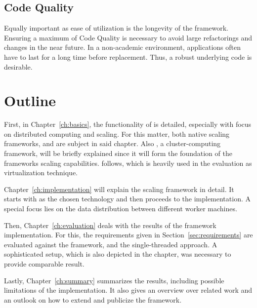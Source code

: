\subsection{Code Quality}
Equally important as ease of utilization is the longevity of the framework. Ensuring a maximum of Code Quality is necessary to avoid large refactorings and \api{} changes in the near future. In a non-academic environment, applications often have to last for a long time before replacement. Thus, a robust underlying code is desirable.



\section{Outline}
First, in Chapter~\ref{ch:basics}, the functionality of \uima{} is detailed, especially with focus on distributed computing and scaling. For this matter, both native \uima{} scaling frameworks, \uimaas{} and \cpe{} are subject in said chapter. Also \spark{}, a cluster-computing framework, will be briefly explained since it will form the foundation of the frameworks scaling capabilities. \docker{} follows, which is heavily used in the evaluation as virtualization technique. 

Chapter~\ref{ch:implementation} will explain the scaling framework in detail. It starts with \spark{} as the chosen technology and then proceeds to the implementation. A special focus lies on the data distribution between different worker machines.

Then, Chapter~\ref{ch:evaluation} deals with the results of the framework implementation. For this, the requirements given in Section~\ref{sec:requirements} are evaluated against the framework, \uimaas{} and the single-threaded approach. A sophisticated setup, which is also depicted in the chapter, was necessary to provide comparable result.

Lastly, Chapter~\ref{ch:summary} summarizes the results, including possible limitations of the implementation. It also gives an overview over related work and an outlook on how to extend and publicize the framework.